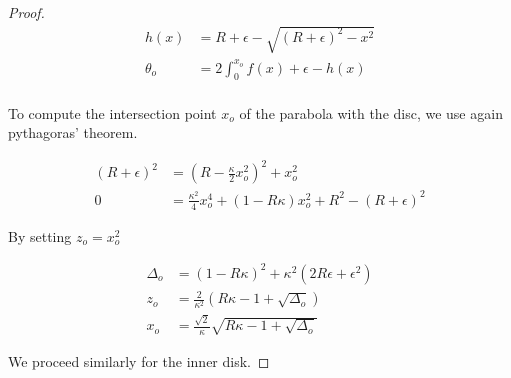 \begin{proof}
\begin{align*}
	h(x) &= R+\epsilon - \sqrt{ (R+\epsilon)^2 - x^2}\\
	\theta_o &= 2\int_0^{x_o}{f(x) + \epsilon - h(x)}\\
\end{align*}

To compute the intersection point $x_o$ of the parabola with the disc, we use again pythagoras' theorem.

\begin{align*}
	(R+\epsilon)^2 &= (R-\frac{\kappa}{2}x_o^2)^2 + x_o^2\\
	0 &= \frac{\kappa^2}{4}x_o^4 + (1-R\kappa)x_o^2 + R^2 - (R+\epsilon)^2
\end{align*}

By setting $z_o=x_o^2$

\begin{align*}
\Delta_o &= (1-R\kappa)^2 + \kappa^2(2R\epsilon + \epsilon^2)\\
z_o &= \frac{2}{\kappa^2}(R\kappa-1 + \sqrt{\Delta_o})\\
x_o &= \frac{\sqrt{2}}{\kappa}\sqrt{R\kappa-1+\sqrt{\Delta_o}}
\end{align*}

We proceed similarly for the inner disk.



\end{proof}

